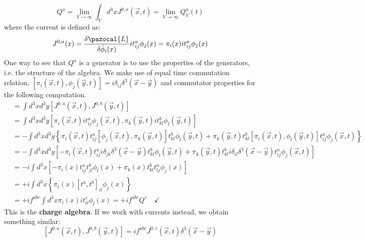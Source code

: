 \documentclass[../main.tex]{subfiles}
\begin{document}
\[
Q^a=\lim_{V\to\infty}\int_V d^3xJ^{0,a}(\Vec{x},t)=\lim_{V\to\infty}Q_V^a(t)
\]
where the current is defined as:
\[
J^{0,a}(x)=\frac{\delta\pazocal{L}}{\delta\Dot{\phi}_i(x)}it_{ij}^a\phi_j(x)=\pi_i(x)it_{ij}^a\phi_j(x)
\]
One way to see that $Q^a$ is a generator is to use the properties of the generators, i.e. the structure of the algebra. We make use of equal time commutation relation, $[\pi_i(\Vec{x},t),\phi_j(\Vec{y},t)]=i\delta_{ij}\delta^3(\Vec{x}-\Vec{y})$ and commutator properties for the following computation.
\begin{align*}
[Q^a,Q^b]&=\int d^3xd^3y[J^{0,a}(\Vec{x},t),J^{0,b}(\Vec{y},t)]\\
&=\int d^3xd^3y[\pi_i(\Vec{x},t)it_{ij}^a\phi_j(\Vec{x},t),\pi_k(\Vec{y},t)it_{kl}^b\phi_l(\Vec{y},t)]\\
&=-\int d^3xd^3y\left\{\pi_i(\Vec{x},t)t_{ij}^a[\phi_j(\Vec{x},t),\pi_k(\Vec{y},t)]t_{kl}^b\phi_l(\Vec{y},t)+\pi_k(\Vec{y},t)t_{kl}^b[\pi_i(\Vec{x},t),\phi_l(\Vec{y},t)]t_{ij}^a\phi_j(\Vec{x},t)\right\}\\
&=-\int d^3xd^3y\left[-\pi_i(\Vec{x},t)t_{ij}^ai\delta_{jk}\delta^3(\Vec{x}-\Vec{y})t_{kl}^b\phi_l(\Vec{y},t)+\pi_k(\Vec{y},t)t_{kl}^bi\delta_{il}\delta^3(\Vec{x}-\Vec{y})t_{ij}^a\phi_j(\Vec{x},t)\right]\\
&=-i\int d^3x\left[-\pi_i(x)t_{ij}^at_{jl}^b\phi_l(x)+\pi_k(x)t_{kl}^bt_{lj}^a\phi_j(x)\right]\\
&=+i\int d^3x\left\{\pi_i(x)[t^a,t^b]_{il}\phi_j(x)\right\}\\
&=+if^{abc}\int d^3x\pi_i(x)it_{il}^c\phi_l(x)=+if^{abc}Q^c \quad \checkmark
\end{align*}
This is the \textbf{charge algebra}. If we work with currents instead, we obtain something similar:
\[
[J^{0,a}(\Vec{x},t),J^{0,b}(\Vec{y},t)]=if^{abc}J^{0,c}(\Vec{x},t)\delta^3(\Vec{x}-\Vec{y})
\]
\end{document}
